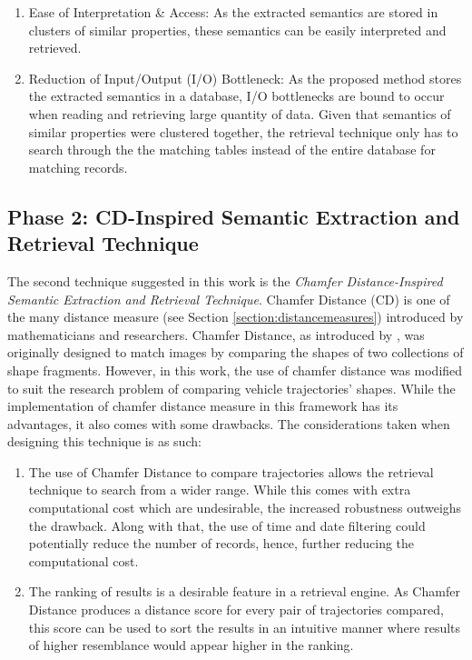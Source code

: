 \begin{enumerate}
    \item Ease of Interpretation \& Access: As the extracted semantics are stored in clusters of similar properties, these semantics can be easily interpreted and retrieved.
    \item Reduction of Input/Output (I/O) Bottleneck: As the proposed method stores the extracted semantics in a database, I/O bottlenecks are bound to occur when reading and retrieving large quantity of data. Given that semantics of similar properties were clustered together, the retrieval technique only has to search through the the matching tables instead of the entire database for matching records.
\end{enumerate}


\subsection{Phase 2: CD-Inspired Semantic Extraction and Retrieval Technique}
The second technique suggested in this work is the \textit{Chamfer Distance-Inspired Semantic Extraction and Retrieval Technique}.
Chamfer Distance (CD) is one of the many distance measure (see Section \ref{section:distancemeasures}) introduced by mathematicians and researchers. Chamfer Distance, as introduced by \cite{barrow1977parametric}, was originally designed to match images by comparing the shapes of two collections of shape fragments.
However, in this work, the use of chamfer distance was modified to suit the research problem of comparing vehicle trajectories' shapes. While the implementation of chamfer distance measure in this framework has its advantages, it also comes with some drawbacks. The considerations taken when designing this technique is as such:

\begin{enumerate}
    \item The use of Chamfer Distance to compare trajectories allows the retrieval technique to search from a wider range. While this comes with extra computational cost which are undesirable, the increased robustness outweighs the drawback. Along with that, the use of time and date filtering could potentially reduce the number of records, hence, further reducing the computational cost.
    \item The ranking of results is a desirable feature in a retrieval engine. As Chamfer Distance produces a distance score for every pair of trajectories compared, this score can be used to sort the results in an intuitive manner where results of higher resemblance would appear higher in the ranking.
\end{enumerate}


